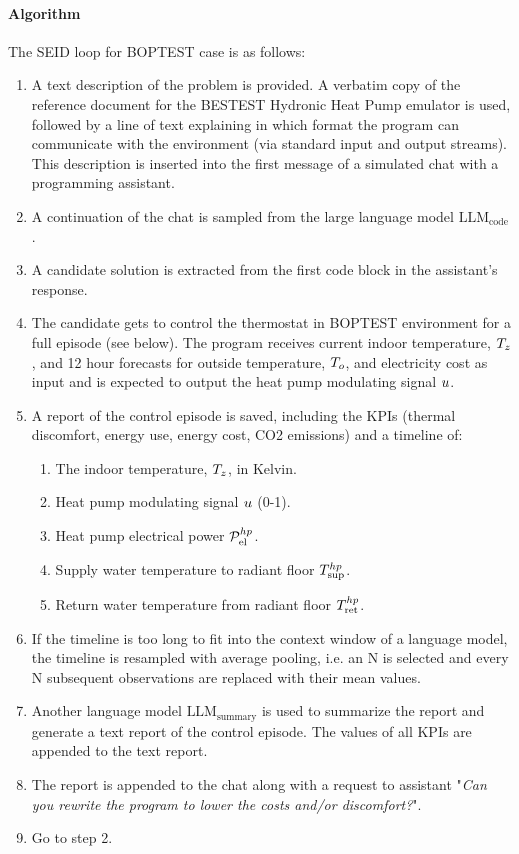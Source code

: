 \paragraph{Algorithm} The SEID loop for BOPTEST case is as follows:
\begin{enumerate}
  \item A text description of the problem is provided. A verbatim copy of the reference document for the BESTEST Hydronic Heat Pump emulator is used, followed by a line of text explaining in which format the program can communicate with the environment (via standard input and output streams). This description is inserted into the first message of a simulated chat with a programming assistant.
  \item A continuation of the chat is sampled from the large language model $\text{LLM}_\text{code}$.
  \item A candidate solution is extracted from the first code block in the assistant’s response.
  \item The candidate gets to control the thermostat in BOPTEST environment for a full episode (see below). The program receives current indoor temperature, $T_z$, and 12 hour forecasts for outside temperature, $T_o$, and electricity cost as input and is expected to output the heat pump modulating signal $u$.
  \item A report of the control episode is saved, including the KPIs (thermal discomfort, energy use, energy cost, CO2 emissions) and a timeline of:
  \begin{enumerate}
      \item The indoor temperature, $T_z$, in Kelvin.
      \item Heat pump modulating signal $u$ (0-1).
      \item Heat pump electrical power ${\mathcal{P}_\text{el}^{hp}}$.
      \item Supply water temperature to radiant floor ${T_\text{sup}^{hp}}$.
      \item Return water temperature from radiant floor ${T_\text{ret}^{hp}}$.
  \end{enumerate}
  \item If the timeline is too long to fit into the context window of a language model, the timeline is resampled with average pooling, i.e. an N is selected and every N subsequent observations are replaced with their mean values.
  \item Another language model $\text{LLM}_\text{summary}$ is used to summarize the report and generate a text report of the control episode. The values of all KPIs are appended to the text report.
  \item The report is appended to the chat along with a request to assistant "\textit{Can you rewrite the program to lower the costs and/or discomfort?}".
  \item Go to step 2.
\end{enumerate}

